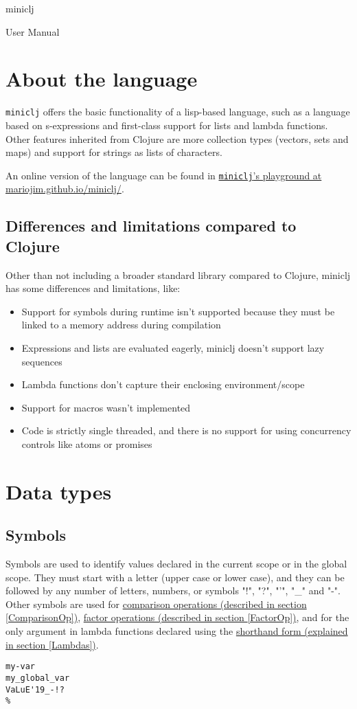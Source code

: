 \documentclass[11pt]{scrreprt}
\begin{document}
{\centering
{\huge
miniclj\par}
{\LARGE
User Manual\par}}

\tableofcontents

\chapter{About the language}
\texttt{miniclj} offers the basic functionality of a lisp-based language, such as a language based on s-expressions and first-class support for lists and lambda functions. Other features inherited from Clojure are more collection types (vectors, sets and maps) and support for strings as lists of characters.

An online version of the language can be found in \href{https://mariojim.github.io/miniclj/}{\texttt{miniclj}'s playground at mariojim.github.io/miniclj/}.

\section{Differences and limitations compared to Clojure}
Other than not including a broader standard library compared to Clojure, miniclj has some differences and limitations, like:
\begin{itemize}
    \item Support for symbols during runtime isn't supported because they must be linked to a memory address during compilation
    \item Expressions and lists are evaluated eagerly, miniclj doesn't support lazy sequences
    \item Lambda functions don't capture their enclosing environment/scope
    \item Support for macros wasn't implemented
    \item Code is strictly single threaded, and there is no support for using concurrency controls like atoms or promises
\end{itemize}

\chapter{Data types}
\section{Symbols}
Symbols are used to identify values declared in the current scope or in the global scope. They must start with a letter (upper case or lower case), and they can be followed by any number of letters, numbers, or symbols "!", "?", "'", "\_" and "-". Other symbols are used for \hyperref[ComparisonOp]{comparison operations (described in section \ref{ComparisonOp})}, \hyperref[FactorOp]{factor operations (described in section \ref{FactorOp})}, and for the only argument in lambda functions declared using the \hyperref[Lambdas]{shorthand form (explained in section \ref{Lambdas})}.
\begin{verbatim}
my-var
my_global_var
VaLuE'19_-!?
%
\end{verbatim}
\end{document}
